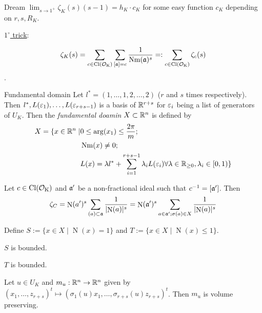 \documentclass[12pt, a4paper]{article}
\DeclareMathOperator{\Nm}{Nm}
\DeclareMathOperator{\Rgez}{\R_{\geq 0}}
\DeclareMathOperator{\Norm}{N}
\begin{document}
	\begin{thm}{Dream}{}
		$\lim_{s \to 1^+} \zeta_K(s)(s-1) = h_K \cdot c_K$ for some easy function 
		$c_K$ depending on $r, s, R_K$.
	\end{thm}

	\underline{$1^\circ$ trick}: 
	\begin{prop}{}{}
	$$\zeta_K(s) = \sum_{c \in \Cl(\OK)} 
	\sum_{[\aa] = c} \frac{1}{\Nm(\aa)^s} =: \sum_{c\in \Cl(\OK)} \zeta_c(s)$$.
	\end{prop}

	\begin{Def}{Fundamental domain}{}
		Let $l^* = (1,\dots,1,2,\dots,2)$ ($r$ and $s$ times respectively). 
		Then $l^*, L(\eps_1), \dots, L(\eps_{r+s-1})$ is a basis of $\R^{r+s}$
		for $\eps_i$ being a list of generators of $U_K$. Then the 
		\emph{fundamental doamin} $X \subset \R^n$ is defined by 
		\begin{align*}
			X = \{x \in \R^n \mid & 0 \leq \arg(x_1) \leq \frac{2\pi}{m}; \\
		 & \Nm(x) \neq 0; \\ 
		 & L(x) = \lambda l^* + \sum_{i=1}^{r+s-1} \lambda_i L(\eps_i)
		\forall \lambda \in \Rgez, \lambda_i \in [0,1) \}
		\end{align*}
	\end{Def}

	\begin{prop}{}{}
		Let $c \in \Cl(\OK)$ and $\aa'$ be a non-fractional ideal such that 
		$c^{-1} = [\aa']$. Then 
		\begin{align*}
			\zeta_C = \Norm(a')^s \sum_{(a) \subset \aa} \frac{1}{\abs{\Norm(a)}^s}
			= \Norm(\aa')^s \sum_{a \in \aa'; \sigma(a) \in X} \frac{1}{\abs{\Norm
			(a)}^s}
		\end{align*}
	\end{prop}

	Define 
	$S := \{x \in X \mid \Norm(x) = 1\} $ and 
	$T := \{x \in X \mid \Norm(x) \leq 1\} $.

	\begin{Lemma}{}{}
		$S$ is bounded.
	\end{Lemma}

	\begin{Lemma}{}{}
		$T$ is bounded.
	\end{Lemma}

	\begin{Lemma}{}{}
		Let $u \in U_K$ and $m_u: \R^n \to \R^n$ given by 
		$(x_1, \dots, z_{r+s})^t \mapsto (\sigma_1(u)x_1, \dots, 
		\sigma_{r+s}(u)z_{r+s})^t$. Then $m_u$ is volume preserving.
	\end{Lemma}
\end{document}
